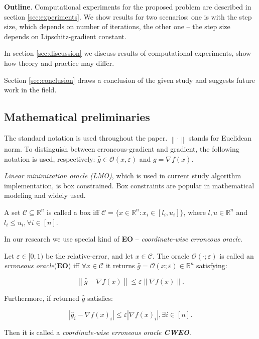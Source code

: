 \documentclass[runningheads, final]{llncs}
\newcommand{\norm}[1]{\left\lVert#1\right\rVert}
\newcommand{\errgrad}{\hat{g}}
\begin{document}
\textbf{Outline}. Computational experiments for the proposed problem are
described in section \ref{sec:experiments}. We show results for two scenarios:
one is with the step size, which depends on number of iterations, the other one
-- the step size depends on Lipschitz-gradient constant.

In section \ref{sec:discussion} we discuss results of computational experiments,
show how theory and practice may differ.

Section \ref{sec:conclusion} draws a conclusion of the given study and suggests
future work in the field.

\subsection{Mathematical preliminaries}

The standard notation is used throughout the paper. $\norm{\cdot}$ stands for
Euclidean norm. To distinguish between erroneous-gradient and gradient, the
following notation is used, respectively:
$\errgrad \in \mathcal{O}(x, \varepsilon)$ and $g = \nabla f(x)$.

\textit{Linear minimization oracle (LMO)}, which is used in current study
algorithm implementation, is box constrained. Box constraints are popular in
mathematical modeling and widely used.

\begin{definition}
    A set $\mathcal{C} \subseteq \mathbb{R}^n$ is called a box iff
    $\mathcal{C} = \{x \in \mathbb{R}^n: x_i \in [l_i, u_i]\}$, where $l, u \in
        \mathbb{R}^n$ and $l_i \leqslant u_i, \forall i \in [n]$.
\end{definition}

In our research we use special kind of \textbf{EO} -- \textit{coordinate-wise
    erroneous oracle}.

\begin{definition}
    Let $\varepsilon \in [0, 1)$ be the relative-error, and let
    $x \in \mathcal{C}$. The oracle $\mathcal{O}(\cdot; \varepsilon)$ is called
    an \textit{erroneous oracle}(\textbf{EO}) iff $\forall x \in \mathcal{C}$ it
    returns $\errgrad = \mathcal{O}(x; \varepsilon) \in \mathbb{R}^n$
    satisfying:

    \begin{equation}
        \norm{\errgrad - \nabla f(x)} \leqslant \varepsilon \norm{\nabla f(x)}.
    \end{equation}

    Furthermore, if returned $\errgrad$ satisfies:

    \begin{equation}
        |\errgrad_i - \nabla f(x)_i| \leqslant \varepsilon |\nabla f(x)_i|,
        \exists i \in [n].
    \end{equation}

    Then it is called a \textit{coordinate-wise erroneous oracle \textbf{CWEO}}.

\end{definition}
\end{document}
